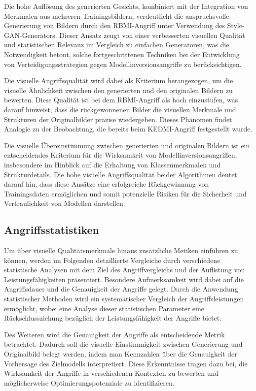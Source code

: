 Die hohe Auflösung des generierten Gesichts, kombiniert mit der Integration von Merkmalen aus mehreren Trainingsbildern, verdeutlicht die anspruchsvolle Generierung von Bildern durch den \glqq RBMI\grqq-Angriff unter Verwendung des Style-GAN-Generators. Dieser Ansatz zeugt von einer verbesserten visuellen Qualität und statistischen Relevanz im Vergleich zu einfachen Generatoren, was die Notwendigkeit betont, solche fortgeschrittenen Techniken bei der Entwicklung von Verteidigungsstrategien gegen Modellinversionsangriffe zu berücksichtigen.

Die visuelle Angriffsqualität wird dabei als Kriterium herangezogen, um die visuelle Ähnlichkeit zwischen den generierten und den originalen Bildern zu bewerten. Diese Qualität ist bei dem \glqq RBMI\grqq-Angriff als hoch einzustufen, was darauf hinweist, dass die rückgewonnenen Bilder die visuellen Merkmale und Strukturen der Originalbilder präzise wiedergeben. Dieses Phänomen findet Analogie zu der Beobachtung, die bereits beim \glqq KEDMI\grqq-Angriff festgestellt wurde.

Die visuelle Übereinstimmung zwischen generierten und originalen Bildern ist ein entscheidendes Kriterium für die Wirksamkeit von Modellinversionsangriffen, insbesondere im Hinblick auf die Erhaltung von Klassenmerkmalen und Strukturdetails. Die hohe visuelle Angriffsqualität beider Algorithmen deutet darauf hin, dass diese Ansätze eine erfolgreiche Rückgewinnung von Trainingsdaten ermöglichen und somit potenzielle Risiken für die Sicherheit und Vertraulichkeit von Modellen darstellen.
\subsection{Angriffsstatistiken}
Um über visuelle Qualitätsmerkmale hinaus zusätzliche Metiken einführen zu können, werden im Folgenden detaillierte Vergleiche durch verschiedene statistische Analysen mit dem Ziel des Angriffvergleichs und der Auflistung von Leistungsfähigkeiten präsentiert. Besondere Aufmerksamkeit wird dabei auf die Angriffsdauer und die Genauigkeit der Angriffe gelegt. Durch die Anwendung statistischer Methoden wird ein systematischer Vergleich der Angriffsleistungen ermöglicht, wobei eine Analyse dieser statistischen Parameter eine Rückschlussziehung bezüglich der Leistungsfähigkeit der Angriffe bietet.

Des Weiteren wird die Genauigkeit der Angriffe als entscheidende Metrik betrachtet. Dadurch soll die visuelle Einstimmigkeit zwischen Generierung und Originalbild belegt werden, indem man Kennzahlen über die Genauigkeit der Vorhersage des Zielmodells interpretiert. Diese Erkenntnisse tragen dazu bei, die Wirksamkeit der Angriffe in verschiedenen Kontexten zu bewerten und möglicherweise Optimierungspotenziale zu identifizieren.

